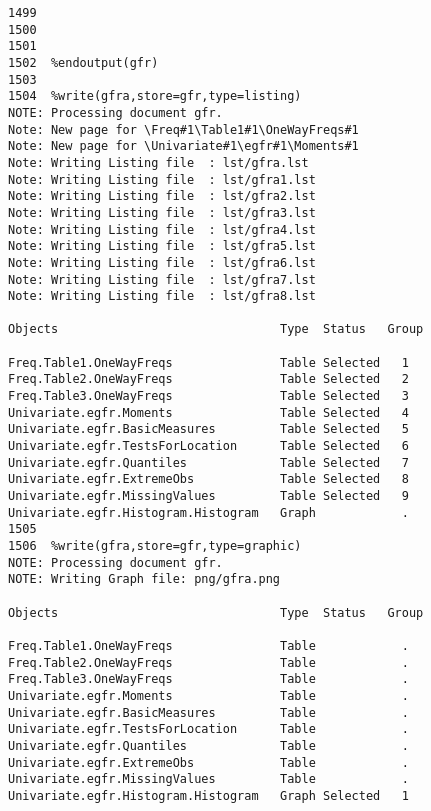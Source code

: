 \documentclass{article}\usepackage[]{graphicx}\usepackage[]{color}
\begin{document}
\begin{verbatim}
1499
1500
1501
1502  %endoutput(gfr)
1503
1504  %write(gfra,store=gfr,type=listing)
NOTE: Processing document gfr.
Note: New page for \Freq#1\Table1#1\OneWayFreqs#1
Note: New page for \Univariate#1\egfr#1\Moments#1
Note: Writing Listing file  : lst/gfra.lst
Note: Writing Listing file  : lst/gfra1.lst
Note: Writing Listing file  : lst/gfra2.lst
Note: Writing Listing file  : lst/gfra3.lst
Note: Writing Listing file  : lst/gfra4.lst
Note: Writing Listing file  : lst/gfra5.lst
Note: Writing Listing file  : lst/gfra6.lst
Note: Writing Listing file  : lst/gfra7.lst
Note: Writing Listing file  : lst/gfra8.lst

Objects                               Type  Status   Group

Freq.Table1.OneWayFreqs               Table Selected   1
Freq.Table2.OneWayFreqs               Table Selected   2
Freq.Table3.OneWayFreqs               Table Selected   3
Univariate.egfr.Moments               Table Selected   4
Univariate.egfr.BasicMeasures         Table Selected   5
Univariate.egfr.TestsForLocation      Table Selected   6
Univariate.egfr.Quantiles             Table Selected   7
Univariate.egfr.ExtremeObs            Table Selected   8
Univariate.egfr.MissingValues         Table Selected   9
Univariate.egfr.Histogram.Histogram   Graph            .
1505
1506  %write(gfra,store=gfr,type=graphic)
NOTE: Processing document gfr.
NOTE: Writing Graph file: png/gfra.png

Objects                               Type  Status   Group

Freq.Table1.OneWayFreqs               Table            .
Freq.Table2.OneWayFreqs               Table            .
Freq.Table3.OneWayFreqs               Table            .
Univariate.egfr.Moments               Table            .
Univariate.egfr.BasicMeasures         Table            .
Univariate.egfr.TestsForLocation      Table            .
Univariate.egfr.Quantiles             Table            .
Univariate.egfr.ExtremeObs            Table            .
Univariate.egfr.MissingValues         Table            .
Univariate.egfr.Histogram.Histogram   Graph Selected   1

\end{verbatim}
\end{document}
